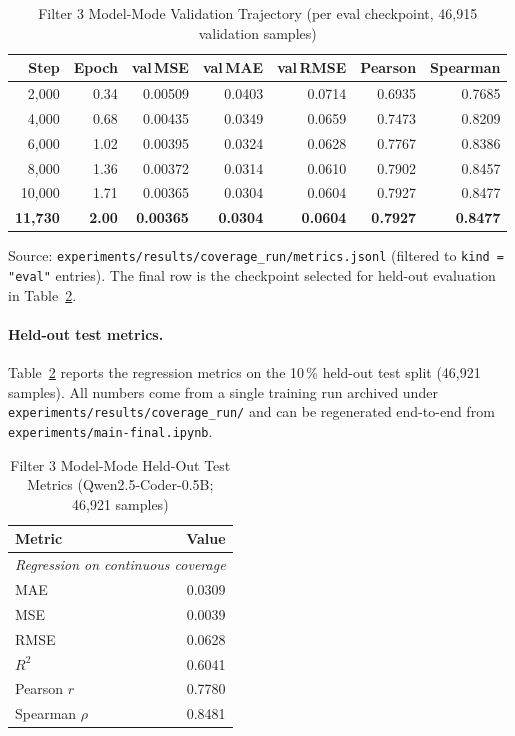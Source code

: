 \documentclass[acmlarge,nonacm,screen]{acmart}
\begin{document}
\begin{table}[htbp]
\caption{Filter 3 Model-Mode Validation Trajectory (per eval checkpoint, 46{,}915 validation samples)}
\label{tab:filter3-traj}
\begin{tabular}{@{}rrrrrrr@{}}
\toprule
\textbf{Step} & \textbf{Epoch} & \textbf{val\,MSE} & \textbf{val\,MAE} & \textbf{val\,RMSE} & \textbf{Pearson} & \textbf{Spearman} \\
\midrule
2{,}000  & 0.34 & 0.00509 & 0.0403 & 0.0714 & 0.6935 & 0.7685 \\
4{,}000  & 0.68 & 0.00435 & 0.0349 & 0.0659 & 0.7473 & 0.8209 \\
6{,}000  & 1.02 & 0.00395 & 0.0324 & 0.0628 & 0.7767 & 0.8386 \\
8{,}000  & 1.36 & 0.00372 & 0.0314 & 0.0610 & 0.7902 & 0.8457 \\
10{,}000 & 1.71 & 0.00365 & 0.0304 & 0.0604 & 0.7927 & 0.8477 \\
\textbf{11{,}730} & \textbf{2.00} & \textbf{0.00365} & \textbf{0.0304} & \textbf{0.0604} & \textbf{0.7927} & \textbf{0.8477} \\
\bottomrule
\end{tabular}
\begin{flushleft}
\small Source: \texttt{experiments/results/coverage\_run/metrics.jsonl}
(filtered to \texttt{kind = "eval"} entries). The final row is the
checkpoint selected for held-out evaluation in
Table~\ref{tab:filter3-model-mode}.
\end{flushleft}
\end{table}

\paragraph{Held-out test metrics.} Table~\ref{tab:filter3-model-mode}
reports the regression metrics on the 10\,\% held-out test split
(46{,}921 samples). All numbers come from a single training run
archived under \texttt{experiments/results/coverage\_run/} and can
be regenerated end-to-end from
\texttt{experiments/main-final.ipynb}.

\begin{table}[htbp]
\caption{Filter 3 Model-Mode Held-Out Test Metrics (Qwen2.5-Coder-0.5B; 46{,}921 samples)}
\label{tab:filter3-model-mode}
\begin{tabular}{@{}lr@{}}
\toprule
\textbf{Metric} & \textbf{Value} \\
\midrule
\multicolumn{2}{l}{\emph{Regression on continuous coverage}} \\
\quad MAE & 0.0309 \\
\quad MSE & 0.0039 \\
\quad RMSE & 0.0628 \\
\quad $R^2$ & 0.6041 \\
\quad Pearson $r$ & 0.7780 \\
\quad Spearman $\rho$ & 0.8481 \\
\bottomrule
\end{tabular}
\end{table}
\end{document}
